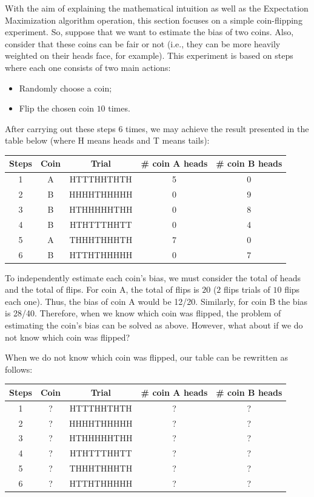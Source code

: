 With the aim of explaining the mathematical intuition as well as the Expectation Maximization algorithm operation, this section focuses on a simple coin-flipping experiment. So, suppose that we want to estimate the bias of two coins. Also, consider that these coins can be fair or not (i.e., they can be more heavily weighted on their heads face, for example). This experiment is based on steps where each one consists of two main actions:

\begin{itemize}
    \item Randomly choose a coin;
    \item Flip the chosen coin $10$ times.
\end{itemize}

After carrying out these steps $6$ times, we may achieve the result presented in the table below (where H means heads and T means tails):

\begin{center}
\begin{tabular}{|c|c|c|c|c|} 
 \hline
 \textbf{Steps} &\textbf{Coin} & \textbf{Trial} & \textbf{\# coin A heads} & \textbf{\# coin B heads} \\ \hline 
1 & A & HTTTHHTHTH & 5 & 0\\ \hline 
2 & B & HHHHTHHHHH & 0 & 9\\ \hline
3 & B & HTHHHHHTHH	& 0 & 8\\ \hline 
4 & B & HTHTTTHHTT & 0 & 4\\ \hline
5 & A & THHHTHHHTH & 7 & 0\\ \hline 
6 & B & HTTHTHHHHH & 0 & 7\\ \hline
\end{tabular}
\end{center}

To independently estimate each coin's bias, we must consider the total of heads and the total of flips. For coin A, the total of flips is $20$ ($2$ flips trials of $10$ flips each one). Thus, the bias of coin A would be 12/20. Similarly, for coin B the bias is 28/40. Therefore, when we know which coin was flipped, the problem of estimating the coin's bias can be solved as above. However, what about if we do not know which coin was flipped?

When we do not know which coin was flipped, our table can be rewritten as follows:

\begin{center}
\begin{tabular}{|c|c|c|c|c|} 
 \hline
 \textbf{Steps} & \textbf{Coin} & \textbf{Trial} & \textbf{\# coin A heads} & \textbf{\# coin B heads} \\ \hline 
1 & ? & HTTTHHTHTH & ? & ?\\ \hline 
2 & ? & HHHHTHHHHH & ? & ?\\ \hline
3 & ? & HTHHHHHTHH	& ? & ?\\ \hline 
4 & ? & HTHTTTHHTT & ? & ?\\ \hline
5 & ? & THHHTHHHTH & ? & ?\\ \hline 
6 & ? & HTTHTHHHHH & ? & ?\\ \hline
\end{tabular}
\end{center}

